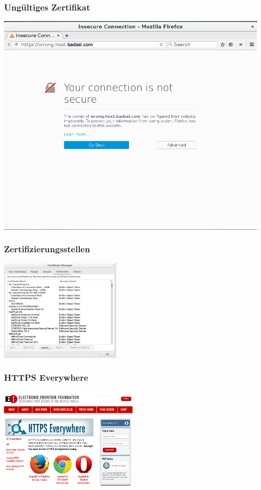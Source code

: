 \documentclass[12pt]{beamer}
\begin{document}
\begin{frame}
    \frametitle{Ungültiges Zertifikat}
    \begin{center}
	\includegraphics[height=0.7\textheight]{img/ssl_badcert.png}
    \end{center}
\end{frame}

\begin{frame}
    \frametitle{Zertifizierungsstellen}
    \begin{center}
      \includegraphics[height=5cm]{img/zertifikate.png}
    \end{center}
\end{frame}

\begin{frame}
  \frametitle{HTTPS Everywhere}
    \begin{center}
      \includegraphics[height=5cm]{img/https-everywhere.png}
    \end{center}
\end{frame}
\end{document}
